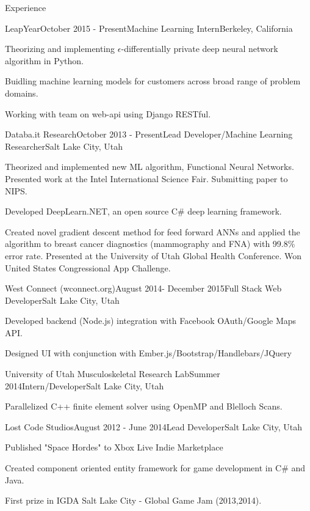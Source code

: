 \documentclass{resume} %
\begin{document}
\begin{rSection}{Experience}

\begin{rSubsection}{LeapYear}{October 2015 - Present}{Machine Learning Intern}{Berkeley, California}
\item Theorizing and implementing $\epsilon$-differentially private deep neural network algorithm in Python.
\item Buidling machine learning models for customers across broad range of problem domains.
\item Working with team on web-api using Django RESTful.
\end{rSubsection}


\begin{rSubsection}{Databa.it Research}{October 2013 - Present}{Lead Developer/Machine Learning Researcher}{Salt Lake City, Utah}
\item Theorized and implemented new ML algorithm, Functional Neural Networks. Presented work at the Intel International Science Fair. Submitting paper to NIPS.
\item Developed DeepLearn.NET, an open source C\# deep learning framework.
\item Created novel gradient descent method for feed forward ANNs and applied the algorithm to breast cancer diagnostics (mammography and FNA) with 99.8\% error rate. Presented at the University of Utah Global Health Conference. Won United States Congressional App Challenge.  
\end{rSubsection}

\begin{rSubsection}{West Connect (wconnect.org)}{August 2014- December 2015}{Full Stack Web Developer}{Salt Lake City, Utah}
\item Developed backend (Node.js) integration with Facebook OAuth/Google Maps API.
\item Designed UI with conjunction with Ember.js/Bootstrap/Handlebars/JQuery
\end{rSubsection}

\begin{rSubsection}{University of Utah Musculoskeletal Research Lab}{Summer 2014}{Intern/Developer}{Salt Lake City, Utah}
\item Parallelized C++ finite element solver using OpenMP and Blelloch Scans.
\end{rSubsection}

\begin{rSubsection}{Lost Code Studios}{August 2012 - June 2014}{Lead Developer}{Salt Lake City, Utah}
\item Published "Space Hordes" to Xbox Live Indie Marketplace
\item Created component oriented entity framework for game development in C\# and Java.
\item First prize in IGDA Salt Lake City - Global Game Jam (2013,2014).
\end{rSubsection}





\end{rSection}
\end{document}
